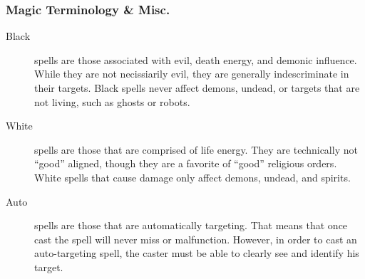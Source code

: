 \subsubsection{Magic Terminology \& Misc.}

\begin{description}
\item[Black] spells are those associated with evil, death energy, and
  demonic influence.  While they are not necissiarily evil, they are
  generally indescriminate in their targets.  Black spells never
  affect demons, undead, or targets that are not living, such as
  ghosts or robots.

\item[White] spells are those that are comprised of life energy.  They
  are technically not ``good'' aligned, though they are a favorite of
  ``good'' religious orders.  White spells that cause damage only
  affect demons, undead, and spirits.

\item[Auto] spells are those that are automatically targeting.  That
  means that once cast the spell will never miss or malfunction.
  However, in order to cast an auto-targeting spell, the caster must
  be able to clearly see and identify his target.

\end{description}

